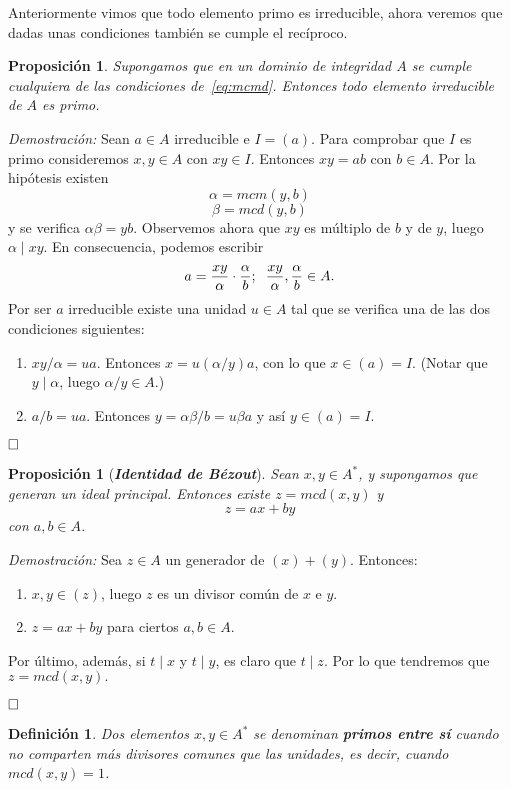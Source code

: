 \documentclass[12pt]{article}
\newtheorem{proposition}[theorem]{Proposición}
\newtheorem{definition}[theorem]{Definición}
\begin{document}
Anteriormente vimos que todo elemento primo es irreducible, ahora veremos que dadas unas condiciones también se cumple el recíproco.
\begin{proposition}\label{pregauss0} Supongamos que en un dominio de integridad $A$ se cumple cualquiera de las condiciones de~\ref{eq:mcmd}. Entonces todo elemento irreducible de $A$ es primo.
\end{proposition}
\emph{Demostración: } Sean $a \in A$ irreducible e $I = (a)$. Para comprobar que $I$ es primo consideremos $x,y \in A$ con $xy \in I$. Entonces $xy = ab$ con $b \in A$. Por la hipótesis existen $$\alpha = mcm (y,b)$$ $$\beta = mcd(y,b)$$ y se verifica $\alpha \beta = yb.$ Observemos ahora que $xy$ es múltiplo de $b$ y de $y$, luego $\alpha \mid xy$. En consecuencia, podemos escribir $$a = \frac{xy}{\alpha} \cdot \frac{\alpha}{b}; \hspace{0.2cm} \frac{xy}{\alpha}, \frac{\alpha}{b} \in A.$$ Por ser $a$ irreducible existe una unidad $u \in A$ tal que se verifica una de las dos condiciones siguientes: \begin{enumerate}
\item $xy/\alpha = ua$. Entonces $x = u(\alpha/y)a$, con lo que $x \in (a) = I$. (Notar que $y \mid \alpha$, luego $\alpha /y \in A$.)
\item $a/b = ua$. Entonces $y = \alpha \beta /b = u \beta a$ y así $y \in (a) = I$.
\end{enumerate}

$\hfill \square$

\begin{proposition}[\textbf{\textit{Identidad de Bézout}}] Sean $x, y \in A^{\ast}$, y supongamos que generan un ideal principal. Entonces existe $z = mcd(x,y)$ y $$z = ax + by$$ con $a,b \in A$.
\end{proposition}
\emph{Demostración: }Sea $z \in A$ un generador de $(x) + (y)$. Entonces: \begin{enumerate}
\item $x,y \in (z)$, luego $z$ es un divisor común de $x$ e $y$.
\item $z = ax + by$ para ciertos $a,b \in A$.
\end{enumerate}
Por último, además, si $t \mid x$ y $t \mid y$, es claro que $t \mid z$. Por lo que tendremos que $z = mcd(x,y).$

$\hfill \square$

\begin{definition} Dos elementos $x,y \in A^{\ast}$ se denominan \textbf{primos entre sí} cuando no comparten más divisores comunes que las unidades, es decir, cuando $mcd(x,y) = 1$.
\end{definition}
\end{document}
